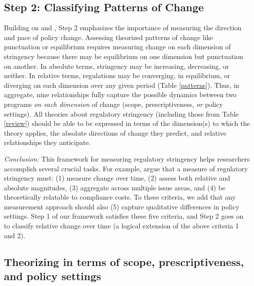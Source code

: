 \documentclass[
      12pt,
            Review ]{article}
\begin{document}
\hypertarget{step-2-classifying-patterns-of-change}{%
\subsection{Step 2: Classifying Patterns of Change}\label{step-2-classifying-patterns-of-change}}

Building on \citet{Baumgartner2002} and \citet{Howlett2007}, Step 2 emphasizes the importance of measuring the direction and pace of policy change. Assessing theorized patterns of change like punctuation or equilibrium requires measuring change on each dimension of stringency because there may be equilibrium on one dimension but punctuation on another. In absolute terms, stringency may be increasing, decreasing, or neither. In relative terms, regulations may be converging, in equilibrium, or diverging on each dimension over any given period (Table \ref{patterns}). Thus, in aggregate, nine relationships fully capture the possible dynamics between two programs \emph{on each dimension} of change (scope, prescriptiveness, \emph{or} policy settings). All theories about regulatory stringency (including those from Table \ref{review}) should be able to be expressed in terms of the dimension(s) to which the theory applies, the absolute directions of change they predict, and relative relationships they anticipate.



\emph{Conclusion:} This framework for measuring regulatory stringency helps researchers accomplish several crucial tasks. For example, \citet{Brunel2016} argue that a measure of regulatory stringency must: (1) measure change over time, (2) assess both relative and absolute magnitudes, (3) aggregate across multiple issue areas, and (4) be theoretically relatable to compliance costs. To these criteria, we add that any measurement approach should also (5) capture qualitative differences in policy settings. Step 1 of our framework satisfies these five criteria, and Step 2 goes on to classify relative change over time (a logical extension of the above criteria 1 and 2).

\hypertarget{theorizing-in-terms-of-scope-prescriptiveness-and-policy-settings}{%
\subsection{Theorizing in terms of scope, prescriptiveness, and policy settings}\label{theorizing-in-terms-of-scope-prescriptiveness-and-policy-settings}}
\end{document}
